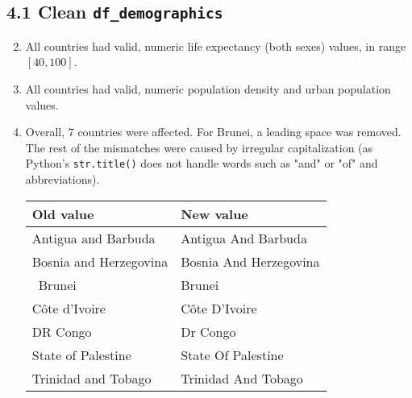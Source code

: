 \documentclass[14pt]{extarticle}
\begin{document}
\subsection*{4.1 Clean \texttt{df\_demographics}}
\begin{enumerate}[label=(\alph*)]
  \setcounter{enumi}{1}
  \item All countries had valid, numeric life expectancy (both sexes) values, in range $[40,100]$.
  \item All countries had valid, numeric population density and urban population values.
  \setcounter{enumi}{5}
  \item Overall, 7 countries were affected. For Brunei, a leading space was removed.
    The rest of the mismatches were caused by irregular capitalization
    (as Python's \texttt{str.title()} does not handle words such as "and" or "of" and abbreviations).
  \begin{center}
    \begin{tabular}{ |l|l| }
      \hline
      Old value&New value\\
      \hline
      Antigua and Barbuda&Antigua And Barbuda\\
      Bosnia and Herzegovina&Bosnia And Herzegovina\\
      \ Brunei&Brunei\\
      Côte d'Ivoire&Côte D'Ivoire\\
      DR Congo&Dr Congo\\
      State of Palestine&State Of Palestine\\
      Trinidad and Tobago&Trinidad And Tobago\\
      \hline
    \end{tabular}
  \end{center}
\end{enumerate}
\end{document}
